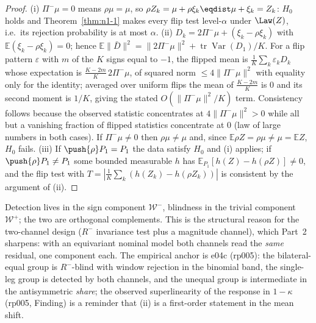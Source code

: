 \begin{proof}
(i) $\Pi^{-}\mu = 0$ means $\rho\mu = \mu$, so $\rho Z_k = \mu + \rho\xi_k
\eqdist \mu + \xi_k = Z_k$: $H_0$ holds and Theorem~\ref{thm:n1-1} makes every
flip test level-$\alpha$ under $\Law(Z)$, i.e.\ its rejection probability is
at most $\alpha$. (ii) $D_k = 2\Pi^{-}\mu + (\xi_k - \rho\xi_k)$ with
$\mathbb{E}(\xi_k - \rho\xi_k) = 0$; hence $\mathbb{E}\|\bar D\|^2 =
\|2\Pi^-\mu\|^2 + \operatorname{tr}\operatorname{Var}(D_1)/K$. For a flip
pattern $\varepsilon$ with $m$ of the $K$ signs equal to $-1$, the flipped
mean is $\tfrac{1}{K}\sum_k \varepsilon_k D_k$ whose expectation is
$\tfrac{K-2m}{K}\,2\Pi^-\mu$, of squared norm $\le 4\|\Pi^-\mu\|^2$ with
equality only for the identity; averaged over uniform flips the mean of
$\tfrac{K-2m}{K}$ is $0$ and its second moment is $1/K$, giving the stated
$O(\|\Pi^-\mu\|^2/K)$ term. Consistency follows because the observed
statistic concentrates at $4\|\Pi^-\mu\|^2 > 0$ while all but a vanishing
fraction of flipped statistics concentrate at $0$ (law of large numbers in
both cases). If $\Pi^-\mu \ne 0$ then $\rho\mu \ne \mu$ and, since
$\mathbb{E}\rho Z = \rho\mu \neq \mu = \mathbb{E}Z$, $H_0$ fails.
(iii) If $\push{\rho}P_1 = P_1$ the data satisfy $H_0$ and (i) applies; if
$\push{\rho}P_1 \neq P_1$ some bounded measurable $h$ has
$\mathbb{E}_{P_1}[h(Z) - h(\rho Z)] \neq 0$, and the flip test with
$T = |\tfrac1K \sum_k (h(Z_k) - h(\rho Z_k))|$ is consistent by the argument
of (ii).
\end{proof}

\begin{remark}[Reading]
Detection lives in the sign component $\mathcal{W}^-$, blindness in the
trivial component $\mathcal{W}^+$; the two are orthogonal complements. This
is the structural reason for the two-channel design ($R^-$ invariance test
plus a magnitude channel), which Part~2 sharpens: with an equivariant nominal
model both channels read the \emph{same} residual, one component each.
The empirical anchor is e04c (rp005): the bilateral-equal group is $R^-$-blind
with window rejection in the binomial band, the single-leg group is detected
by both channels, and the unequal group is intermediate in the antisymmetric
\emph{share}; the observed superlinearity of the response in $1-\kappa$
(rp005, Finding) is a reminder that (ii) is a first-order statement in the
mean shift.
\end{remark}
